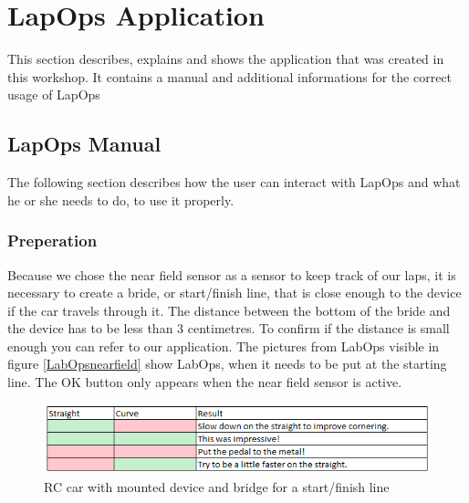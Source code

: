 \chapter{LapOps Application}
This section describes, explains and shows the application that was created in this workshop. It contains a manual and additional informations for the correct usage of LapOps

\section{LapOps Manual}
The following section describes how the user can interact with LapOps and what he or she needs to do, to use it properly.

\subsection{Preperation}
Because we chose the near field sensor as a sensor to keep track of our laps, it is necessary to create a bride, or start/finish line, that is close enough to the device if the car travels through it. The distance between the bottom of the bride and the device has to be less than 3 centimetres. To confirm if the distance is small enough you can refer to our application. The pictures from LabOps visible in figure \ref{LabOpsnearfield} show LabOps, when it needs to be put at the starting line. The OK button only appears when the near field sensor is active.

\begin{figure}[H]
	\centering
	\includegraphics[scale= 0.9]{Pictures/StraightResultMapping.png}
	\caption{RC car with mounted device and bridge for a start/finish line}
	\label{startFinishLineWithRC}
\end{figure}

